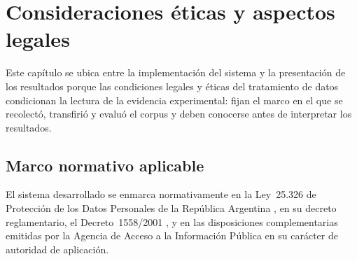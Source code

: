 \section{Consideraciones éticas y aspectos legales}\label{sec:aspectos-legales}

Este capítulo se ubica entre la implementación del sistema y la presentación de los resultados porque las condiciones legales y éticas del tratamiento de datos condicionan la lectura de la evidencia experimental: fijan el marco en el que se recolectó, transfirió y evaluó el corpus y deben conocerse antes de interpretar los resultados.

\subsection{Marco normativo aplicable}\label{subsec:marco-normativo}

El sistema desarrollado se enmarca normativamente en la Ley~25.326 de Protección de los Datos Personales de la República Argentina \parencite{Ley25326_2000}, en su decreto reglamentario, el Decreto~1558/2001 \parencite{Decreto1558_2001}, y en las disposiciones complementarias emitidas por la Agencia de Acceso a la Información Pública en su carácter de autoridad de aplicación.

